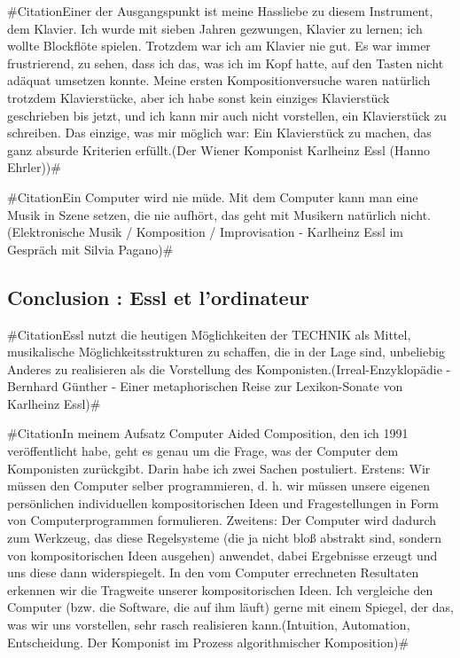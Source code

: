 \documentclass[a4paper,12pt]{article}
\newcommand{\zitat}[2]{\#Citation#1(#2)\#}
\begin{document}
\zitat{Einer der Ausgangspunkt ist meine Hassliebe zu diesem Instrument, dem Klavier. Ich wurde mit sieben Jahren gezwungen, Klavier zu lernen; ich wollte Blockflöte spielen. Trotzdem war ich am Klavier nie gut. Es war immer frustrierend, zu sehen, dass ich das, was ich im Kopf hatte, auf den Tasten nicht adäquat umsetzen konnte. Meine ersten Kompositionversuche waren natürlich trotzdem Klavierstücke, aber ich habe sonst kein einziges Klavierstück geschrieben bis jetzt, und ich kann mir auch nicht vorstellen, ein Klavierstück zu schreiben. Das einzige, was mir möglich war: Ein Klavierstück zu machen, das ganz absurde Kriterien erfüllt.}
{Der Wiener Komponist Karlheinz Essl (Hanno Ehrler)}

\zitat{Ein Computer wird nie müde. Mit dem Computer kann man eine Musik in Szene setzen, die nie aufhört, das geht mit Musikern natürlich nicht.}
{Elektronische Musik / Komposition / Improvisation - Karlheinz Essl im Gespräch mit Silvia Pagano}

\subsection{Conclusion : Essl et l'ordinateur}

\zitat{Essl nutzt die heutigen Möglichkeiten der TECHNIK als Mittel, musikalische Möglichkeitsstrukturen zu schaffen, die in der Lage sind, unbeliebig Anderes zu realisieren als die Vorstellung des Komponisten.}
{Irreal-Enzyklopädie - Bernhard Günther - Einer metaphorischen Reise zur Lexikon-Sonate von Karlheinz Essl}

\zitat{In meinem Aufsatz Computer Aided Composition, den ich 1991 veröffentlicht habe, geht es genau um die Frage, was der Computer dem Komponisten zurückgibt. Darin habe ich zwei Sachen postuliert. Erstens: Wir müssen den Computer selber programmieren, d. h. wir müssen unsere eigenen persönlichen individuellen kompositorischen Ideen und Fragestellungen in Form von Computerprogrammen formulieren. Zweitens: Der Computer wird dadurch zum Werkzeug, das diese Regelsysteme (die ja nicht bloß abstrakt sind, sondern von kompositorischen Ideen ausgehen) anwendet, dabei Ergebnisse erzeugt und uns diese dann widerspiegelt. In den vom Computer errechneten Resultaten erkennen wir die Tragweite unserer kompositorischen Ideen. Ich vergleiche den Computer (bzw. die Software, die auf ihm läuft) gerne mit einem Spiegel, der das, was wir uns vorstellen, sehr rasch realisieren kann.}
{Intuition, Automation, Entscheidung. Der Komponist im Prozess algorithmischer Komposition}
\end{document}
